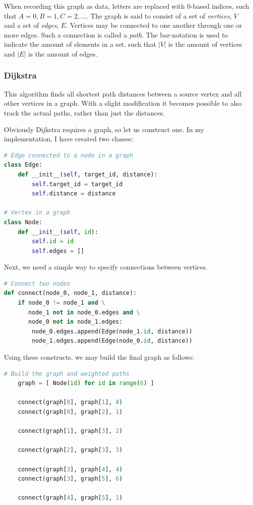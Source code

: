 \documentclass{article}
\begin{document}
When recording this graph as data, letters are replaced with 0-based indices, such that \(A=0, B=1, C=2, \dots\). The graph is said to consist of a set of {\em vertices}, \(V\) and a set of {\em edges}, \(E\). Vertices may be connected to one another through one or more edges. Such a connection is called a {\em path}.
The bar-notation is used to indicate the amount of elements in a set, such that \(|V|\) is the amount of vertices and \(|E|\) is the amount of edges.

\subsubsection{Dijkstra}
This algorithm finds all shortest path distances between a source vertex and all other vertices in a graph.
With a slight modification it becomes possible to also track the actual paths, rather than just the distances.

Obviously Dijkstra requires a graph, so let us construct one.
In my implementation, I have created two classes:

\begin{lstlisting}[language=Python]
# Edge connected to a node in a graph
class Edge:
    def __init__(self, target_id, distance):
        self.target_id = target_id
        self.distance = distance

# Vertex in a graph
class Node:
    def __init__(self, id):
        self.id = id
        self.edges = []
\end{lstlisting}

Next, we need a simple way to specify connections between vertices.

\begin{lstlisting}[language=Python]
# Connect two nodes
def connect(node_0, node_1, distance):
    if node_0 != node_1 and \
       node_1 not in node_0.edges and \
       node_0 not in node_1.edges:
        node_0.edges.append(Edge(node_1.id, distance))
        node_1.edges.append(Edge(node_0.id, distance))
\end{lstlisting}

Using these constructs, we may build the final graph as follows:

\begin{lstlisting}[language=Python]
  # Build the graph and weighted paths
    graph = [ Node(id) for id in range(6) ]
    
    connect(graph[0], graph[1], 8)
    connect(graph[0], graph[2], 1)

    connect(graph[1], graph[3], 2)

    connect(graph[2], graph[3], 3)

    connect(graph[3], graph[4], 4)
    connect(graph[3], graph[5], 6)

    connect(graph[4], graph[5], 1)
\end{lstlisting}
\end{document}
